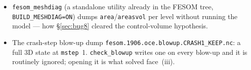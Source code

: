 \documentclass[11pt,a4paper]{article}
\newcommand{\code}[1]{\texttt{\small #1}}
\begin{document}
\begin{itemize}
  \code{inverted\_range.py} (the $\max(\code{ulevels})>\min(\code{nlevels})$ mesh predicate),
  \code{read\_areas.py}, \code{partition\_check.py}, \code{comm\_symmetry.py}. Working notes in
  \code{notes/ssh\_rhs\_leg\_start\_crash.md}.
\item \code{fesom\_meshdiag} (a standalone utility already in the FESOM tree, \code{BUILD\_MESHDIAG=ON})
  dumps \code{area}/\code{areasvol} per level without running the model --- how \S\ref{sec:bug8}
  cleared the control-volume hypothesis.
\item The crash-step blow-up dump \code{fesom.1906.oce.blowup.CRASH1\_KEEP.nc}: a full 3D state at
  \code{mstep}~1. \code{check\_blowup} writes one on every blow-up and it is routinely ignored;
  opening it is what solved face~(iii).
\end{itemize}
\end{document}
